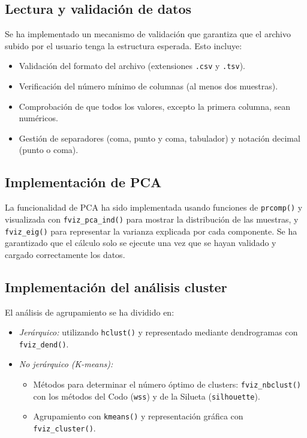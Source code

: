 \subsection{Lectura y validación de datos}

Se ha implementado un mecanismo de validación que garantiza que el archivo subido por el usuario tenga la estructura esperada. Esto incluye:

\begin{itemize}
    \item Validación del formato del archivo (extensiones \texttt{.csv} y \texttt{.tsv}).
    \item Verificación del número mínimo de columnas (al menos dos muestras).
    \item Comprobación de que todos los valores, excepto la primera columna, sean numéricos.
    \item Gestión de separadores (coma, punto y coma, tabulador) y notación decimal (punto o coma).
\end{itemize}

\subsection{Implementación de PCA}

La funcionalidad de PCA ha sido implementada usando funciones de \texttt{prcomp()} y visualizada con \texttt{fviz\_pca\_ind()} para 
mostrar la distribución de las muestras, y \texttt{fviz\_eig()} para representar la varianza explicada por cada componente. 
Se ha garantizado que el cálculo solo se ejecute una vez que se hayan validado y cargado correctamente los datos.

\subsection{Implementación del análisis cluster}

El análisis de agrupamiento se ha dividido en:

\begin{itemize}
    \item \textit{Jerárquico:} utilizando \texttt{hclust()} y representado mediante dendrogramas con \texttt{fviz\_dend()}.
    
    \item \textit{No jerárquico (K-means):}
    \begin{itemize}
        \item Métodos para determinar el número óptimo de clusters: \texttt{fviz\_nbclust()} con los métodos del Codo (\texttt{wss}) y 
        de la Silueta (\texttt{silhouette}).
        \item Agrupamiento con \texttt{kmeans()} y representación gráfica con \texttt{fviz\_cluster()}.
    \end{itemize}
\end{itemize}

